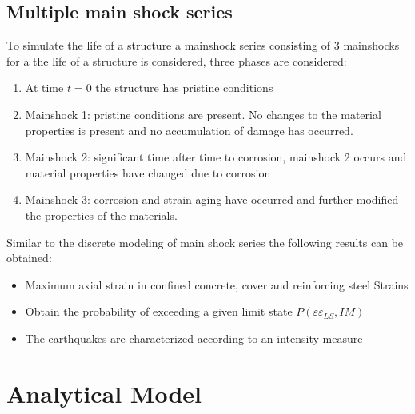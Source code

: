 \subsection{Multiple main shock series}

To simulate the life of a structure a mainshock series consisting of 3 mainshocks for a the life of a structure is considered, three phases are considered:
\begin{enumerate}

	\item At time $t=0$ the structure has pristine conditions
	\item Mainshock 1: pristine conditions are present. No changes to the material properties is present and no accumulation of damage has occurred.
	\item Mainshock 2: significant time after time to corrosion, mainshock 2 occurs and  material properties have changed due to corrosion
	\item Mainshock 3: corrosion and strain aging have occurred and further modified the properties of the materials.
\end{enumerate}

%

Similar to the discrete modeling of main shock series the following results can be obtained:

\begin{itemize}
	\item Maximum axial strain in confined concrete, cover and reinforcing steel 
Strains
	\item Obtain the probability of exceeding a given limit state $P(\varepsilon\varepsilon_{LS},IM)$
	\item The earthquakes are characterized according to an intensity measure

\end{itemize}

\section{Analytical Model}

